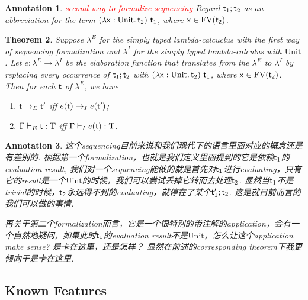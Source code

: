 \documentclass{article}
\theoremstyle{plain}
\newtheorem{theorem}{Theorem}
\newtheorem{annotation}[theorem]{Annotation}
\theoremstyle{nonumberplain}
\newcommand*{\xfunc}[4]{{#2}\colon{#3}{#1}{#4}}
\newcommand*{\func}[3]{\xfunc{\to}{#1}{#2}{#3}}
\newcommand{\lam}[2]{\ensuremath{\lambda #1\ldotp #2}} %
\newcommand{\singletype}[1]{\text{#1}}
\newcommand{\termtype}[2]{\ensuremath{#1:#2}}
\newcommand{\term}[1]{\ensuremath\mathsf{#1}}
\newcommand{\seq}[2]{#1;#2}
\newcommand{\redt}[1]{\textcolor{red}{#1}}
\begin{document}
\begin{annotation}
\rm \redt{ second way to formalize sequencing} Regard $\seq{\term{t}_1}{\term{t}_2}$ as an abbreviation for the term $(\lam{\termtype{\term{x}}{\singletype{Unit}}}{\term{t}_2})~\term{t}_1$, where $\term{x} \in \text{FV}(\term{t_2})$. 
\end{annotation}

\begin{theorem}
\rm Suppose $\lambda^E$ for the simply typed lambda-calcuclus with the first way of sequencing formalization and $\lambda^I$ for the simply typed lambda-calculus with $\singletype{Unit}$. Let $\func{e}{\lambda^E}{\lambda^I}$ be the elaboration function that translates from the $\lambda^E$ to $\lambda^I$ by replacing every occurrence of $\seq{\term{t}_1}{\term{t}_2}$ with $(\lam{\termtype{\term{x}}{\singletype{Unit}}}{\term{t}_2})~\term{t}_1$, where $\term{x} \in \text{FV}(\term{t_2})$. Then for each $\term{t}$ of $\lambda^E$, we have 
\begin{enumerate}
	\item $\term{t} \to_E \term{t}'$ iff $e(\term{t}) \to _I e(\term{t}')$;
	\item $\Gamma \vdash_E \termtype{\term{t}}{\singletype{T}}$ iff $\Gamma \vdash_I \termtype{e(\term{t})}{\singletype{T}}$. 
\end{enumerate} 
\end{theorem}

\begin{annotation}
\rm 这个sequencing目前来说和我们现代下的语言里面对应的概念还是有差别的. 根据第一个formalization，也就是我们定义里面提到的它是依赖$\term{t}_1$的evaluation result, 我们对一个sequencing能做的就是首先对$\term{t}_1$进行evaluating，只有它的result是一个$\singletype{Uint}$的时候，我们可以尝试丢掉它转而去处理$\term{t}_2$.  显然当$\term{t}_1$不是trivial的时候，$\term{t_2}$永远得不到的evaluating，就停在了某个$\seq{\term{t}_1'}{\term{t}_2}$. 这是就目前而言的我们可以做的事情. 

再关于第二个formalization而言，它是一个很特别的带注解的application，会有一个自然地疑问，如果此时$\term{t}_1$的evaluation result不是$\singletype{Unit}$，怎么让这个application make sense? 是卡在这里，还是怎样？ 显然在前述的corresponding theorem下我更倾向于是卡在这里.
\end{annotation}

\newpage
\subsection{Known Features}
\end{document}
